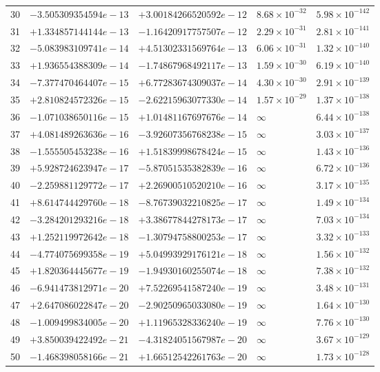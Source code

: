 \documentclass[11pt]{article}
\begin{document}
\begin{longtable}{rllll}
30 & $-3.505309354594e-13$ & $+3.00184266520592e-12$ & $8.68 \times 10^{-32}$ & $5.98 \times 10^{-142}$ \\
31 & $+1.334857144144e-13$ & $-1.16420917757507e-12$ & $2.29 \times 10^{-31}$ & $2.81 \times 10^{-141}$ \\
32 & $-5.083983109741e-14$ & $+4.51302331569764e-13$ & $6.06 \times 10^{-31}$ & $1.32 \times 10^{-140}$ \\
33 & $+1.936554388309e-14$ & $-1.74867968492117e-13$ & $1.59 \times 10^{-30}$ & $6.19 \times 10^{-140}$ \\
34 & $-7.377470464407e-15$ & $+6.77283674309037e-14$ & $4.30 \times 10^{-30}$ & $2.91 \times 10^{-139}$ \\
35 & $+2.810824572326e-15$ & $-2.62215963077330e-14$ & $1.57 \times 10^{-29}$ & $1.37 \times 10^{-138}$ \\
\midrule
36 & $-1.071038650116e-15$ & $+1.01481167697676e-14$ & $\infty$ & $6.44 \times 10^{-138}$ \\
37 & $+4.081489263636e-16$ & $-3.92607356768238e-15$ & $\infty$ & $3.03 \times 10^{-137}$ \\
38 & $-1.555505453238e-16$ & $+1.51839998678424e-15$ & $\infty$ & $1.43 \times 10^{-136}$ \\
39 & $+5.928724623947e-17$ & $-5.87051535382839e-16$ & $\infty$ & $6.72 \times 10^{-136}$ \\
40 & $-2.259881129772e-17$ & $+2.26900510520210e-16$ & $\infty$ & $3.17 \times 10^{-135}$ \\
41 & $+8.614744429760e-18$ & $-8.76739032210825e-17$ & $\infty$ & $1.49 \times 10^{-134}$ \\
42 & $-3.284201293216e-18$ & $+3.38677844278173e-17$ & $\infty$ & $7.03 \times 10^{-134}$ \\
43 & $+1.252119972642e-18$ & $-1.30794758800253e-17$ & $\infty$ & $3.32 \times 10^{-133}$ \\
44 & $-4.774075699358e-19$ & $+5.04993929176121e-18$ & $\infty$ & $1.56 \times 10^{-132}$ \\
45 & $+1.820364445677e-19$ & $-1.94930160255074e-18$ & $\infty$ & $7.38 \times 10^{-132}$ \\
46 & $-6.941473812971e-20$ & $+7.52269541587240e-19$ & $\infty$ & $3.48 \times 10^{-131}$ \\
47 & $+2.647086022847e-20$ & $-2.90250965033080e-19$ & $\infty$ & $1.64 \times 10^{-130}$ \\
48 & $-1.009499834005e-20$ & $+1.11965328336240e-19$ & $\infty$ & $7.76 \times 10^{-130}$ \\
49 & $+3.850039422492e-21$ & $-4.31824051567987e-20$ & $\infty$ & $3.67 \times 10^{-129}$ \\
50 & $-1.468398058166e-21$ & $+1.66512542261763e-20$ & $\infty$ & $1.73 \times 10^{-128}$ \\
\bottomrule
\end{longtable}
\end{document}
